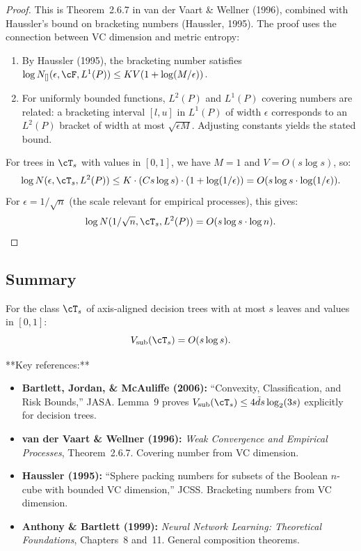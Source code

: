 \begin{proof}
This is Theorem~2.6.7 in van der Vaart \& Wellner (1996), combined with Haussler's bound on bracketing numbers (Haussler, 1995). The proof uses the connection between VC dimension and metric entropy:
\begin{enumerate}
\item By Haussler (1995), the bracketing number satisfies $\log N_{[]}(\epsilon, \cF, L^1(P)) \le K V (1 + \log(M/\epsilon))$.
\item For uniformly bounded functions, $L^2(P)$ and $L^1(P)$ covering numbers are related: a bracketing interval $[l, u]$ in $L^1(P)$ of width $\epsilon$ corresponds to an $L^2(P)$ bracket of width at most $\sqrt{\epsilon M}$. Adjusting constants yields the stated bound.
\end{enumerate}

For trees in $\cT_s$ with values in $[0,1]$, we have $M = 1$ and $V = O(s \log s)$, so:
\[
\log N(\epsilon, \cT_s, L^2(P)) \le K \cdot (Cs \log s) \cdot (1 + \log(1/\epsilon)) = O(s \log s \cdot \log(1/\epsilon)).
\]
For $\epsilon = 1/\sqrt{n}$ (the scale relevant for empirical processes), this gives:
\[
\log N(1/\sqrt{n}, \cT_s, L^2(P)) = O(s \log s \cdot \log n).
\]
\end{proof}

\subsection{Summary}

For the class $\cT_s$ of axis-aligned decision trees with at most $s$ leaves and values in $[0,1]$:
\[
V_{\text{sub}}(\cT_s) = O(s \log s).
\]

**Key references:**
\begin{itemize}
\item \textbf{Bartlett, Jordan, \& McAuliffe (2006):} ``Convexity, Classification, and Risk Bounds,'' JASA. Lemma~9 proves $V_{\text{sub}}(\cT_s) \le 4\tilde{d} s \log_2(3s)$ explicitly for decision trees.
\item \textbf{van der Vaart \& Wellner (1996):} \emph{Weak Convergence and Empirical Processes}, Theorem~2.6.7. Covering number from VC dimension.
\item \textbf{Haussler (1995):} ``Sphere packing numbers for subsets of the Boolean $n$-cube with bounded VC dimension,'' JCSS. Bracketing numbers from VC dimension.
\item \textbf{Anthony \& Bartlett (1999):} \emph{Neural Network Learning: Theoretical Foundations}, Chapters~8 and~11. General composition theorems.
\end{itemize}

